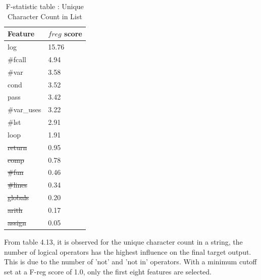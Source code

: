 \begin{itemize}
\begin{table}[H]
\centering
\caption{F-statistic table : Unique Character Count in List}
\begin{tabular}{ll}
\hline
\multicolumn{1}{|l|}{\textbf{Feature}} & \multicolumn{1}{l|}{\textbf{$f{reg}$ score}} \\ \hline
\multicolumn{1}{|l|}{log}              & \multicolumn{1}{l|}{15.76}                 \\ \hline
\multicolumn{1}{|l|}{\#fcall}          & \multicolumn{1}{l|}{4.94}                  \\ \hline
\multicolumn{1}{|l|}{\#var}            & \multicolumn{1}{l|}{3.58}                  \\ \hline
\multicolumn{1}{|l|}{cond}             & \multicolumn{1}{l|}{3.52}                  \\ \hline
\multicolumn{1}{|l|}{pass}             & \multicolumn{1}{l|}{3.42}                  \\ \hline
\multicolumn{1}{|l|}{\#var\_uses}      & \multicolumn{1}{l|}{3.22}                  \\ \hline
\multicolumn{1}{|l|}{\#lst}            & \multicolumn{1}{l|}{2.91}                  \\ \hline
\multicolumn{1}{|l|}{loop}             & \multicolumn{1}{l|}{1.91}                  \\ \hline
\multicolumn{1}{|l|}{\st{return}}           & \multicolumn{1}{l|}{0.95}                  \\ \hline
\multicolumn{1}{|l|}{\st{comp}}             & \multicolumn{1}{l|}{0.78}                  \\ \hline
\multicolumn{1}{|l|}{\st{\#fun}}            & \multicolumn{1}{l|}{0.46}                  \\ \hline
\multicolumn{1}{|l|}{\st{\#lines}}          & \multicolumn{1}{l|}{0.34}                  \\ \hline
\multicolumn{1}{|l|}{\st{globals}}         & \multicolumn{1}{l|}{0.20}                  \\ \hline
\multicolumn{1}{|l|}{\st{arith}}            & \multicolumn{1}{l|}{0.17}                  \\ \hline
\multicolumn{1}{|l|}{\st{assign}}           & \multicolumn{1}{l|}{0.05}      
\\ \hline
\end{tabular}

\label{uc_f}
\end{table}

From table 4.13, it is observed for the unique character count in a string, the number of logical operators has the highest influence on the final target output. This is due to the number of 'not' and 'not in' operators. With a minimum cutoff set at a F-reg score of 1.0, only the first eight features are selected. 


\end{itemize}